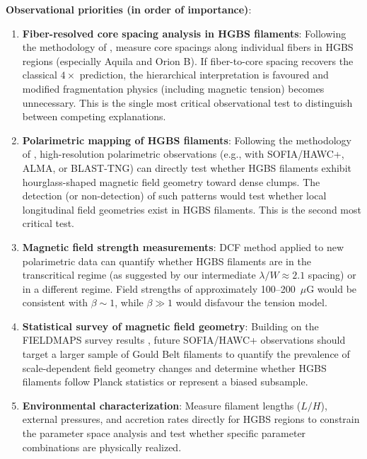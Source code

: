 \documentclass[11pt,a4paper]{article}
\begin{document}
\textbf{Observational priorities (in order of importance)}:
\begin{enumerate}
    \item \textbf{Fiber-resolved core spacing analysis in HGBS filaments}: Following the methodology of \citet{Yang2024}, measure core spacings along individual fibers in HGBS regions (especially Aquila and Orion B). If fiber-to-core spacing recovers the classical $4\times$ prediction, the hierarchical interpretation is favoured and modified fragmentation physics (including magnetic tension) becomes unnecessary. This is the single most critical observational test to distinguish between competing explanations.

    \item \textbf{Polarimetric mapping of HGBS filaments}: Following the methodology of \citet{Jadhav2026}, high-resolution polarimetric observations (e.g., with SOFIA/HAWC+, ALMA, or BLAST-TNG) can directly test whether HGBS filaments exhibit hourglass-shaped magnetic field geometry toward dense clumps. The detection (or non-detection) of such patterns would test whether local longitudinal field geometries exist in HGBS filaments. This is the second most critical test.

    \item \textbf{Magnetic field strength measurements}: DCF method applied to new polarimetric data can quantify whether HGBS filaments are in the transcritical regime (as suggested by our intermediate $\lambda/W \approx 2.1$ spacing) or in a different regime. Field strengths of approximately 100--200~$\mu$G would be consistent with $\beta \sim 1$, while $\beta \gg 1$ would disfavour the tension model.

    \item \textbf{Statistical survey of magnetic field geometry}: Building on the FIELDMAPS survey results \citep{Coude2025}, future SOFIA/HAWC+ observations should target a larger sample of Gould Belt filaments to quantify the prevalence of scale-dependent field geometry changes and determine whether HGBS filaments follow Planck statistics or represent a biased subsample.

    \item \textbf{Environmental characterization}: Measure filament lengths ($L/H$), external pressures, and accretion rates directly for HGBS regions to constrain the parameter space analysis and test whether specific parameter combinations are physically realized.
\end{enumerate}
\end{document}
